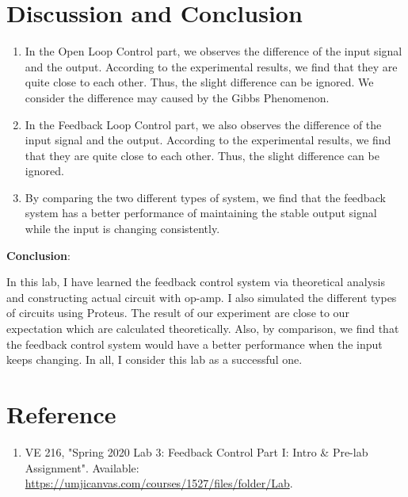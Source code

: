 \documentclass{article}
\begin{document}
{\section{Discussion and Conclusion}
{
    \begin{enumerate}
        \item In the Open Loop Control part, we observes the difference of the input signal and the output. According to the experimental results, we find that they are quite close to each other. Thus, the slight difference can be ignored. We consider the difference may caused by the Gibbs Phenomenon. 
        \item In the Feedback Loop Control part, we also observes the difference of the input signal and the output. According to the experimental results, we find that they are quite close to each other. Thus, the slight difference can be ignored.
        \item By comparing the two different types of system, we find that the feedback system has a better performance of maintaining the stable output signal while the input is changing consistently.
    \end{enumerate}

    \textbf{Conclusion}:

        In this lab, I have learned the feedback control system via theoretical analysis and constructing actual circuit with op-amp. I also simulated the different types of circuits using Proteus. The result of our experiment are close to our expectation which are calculated theoretically. Also, by comparison, we find that the feedback control system would have a better performance when the input keeps changing. In all, I consider this lab as a successful one.
    }
}


\newpage
\section{Reference}
\begin{enumerate}
\item VE 216, "Spring 2020 Lab 3: Feedback Control Part I: Intro \& Pre-lab Assignment".  Available: \url{https://umjicanvas.com/courses/1527/files/folder/Lab}.
\end{enumerate}
\end{document}
